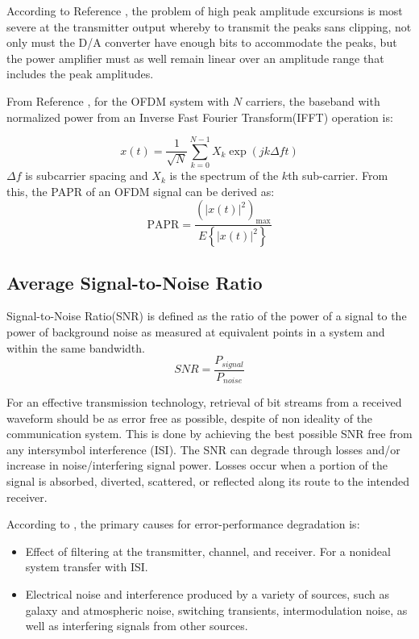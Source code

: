 According to Reference \cite[Ch.4, pp.69]{ofdm_intro}, the problem of high peak amplitude excursions is most severe at the transmitter output whereby to transmit the peaks sans clipping, not only must the D/A converter have enough bits to accommodate the peaks, but the power amplifier must as well remain linear over an amplitude range that includes the peak amplitudes.

From Reference \cite{papr_paper}, for the OFDM system with $N$ carriers, the baseband with normalized power from an Inverse Fast Fourier Transform(IFFT) operation is:

$$x(t) = \frac{1}{\sqrt{N}}\sum_{k=0}^{N-1}X_k\exp (jk\Delta ft)$$
$\Delta f$ is subcarrier spacing and $X_k$ is the spectrum of the $k$th sub-carrier.
From this, the PAPR of an OFDM signal can be derived as:
$$\text{PAPR} = \frac{\left(\left|x(t)\right|^2\right)_{\max}}{E\left\{\left|x(t)\right|^2\right\}}$$

\subsection*{Average Signal-to-Noise Ratio}
Signal-to-Noise Ratio(SNR) is defined as the ratio of the power of a signal to the power of background noise as measured at equivalent points in a system and within the same bandwidth.\cite{dcommoha}
$$SNR = \frac{P_{signal}}{P_{noise}}$$

For an effective transmission technology, retrieval of bit streams from a received
 waveform  should be as error free as possible, despite of non ideality of the communication system. This is done by achieving the best possible SNR free from any
intersymbol interference (ISI).
The SNR can
degrade through losses and/or increase in noise/interfering signal power.
Losses occur when a portion of the signal is absorbed, diverted, scattered, or reflected along its route to
the intended receiver.

According to \cite{AWGN}, the primary causes for error-performance degradation is:
\begin{itemize}
	\item Effect of filtering at the transmitter, channel, and receiver. For a nonideal system transfer with
ISI.
	\item  Electrical noise and interference produced by a variety of sources, such as galaxy and
	atmospheric noise, switching transients, intermodulation noise, as well as interfering signals
	from other sources.
	\end {itemize}
	
